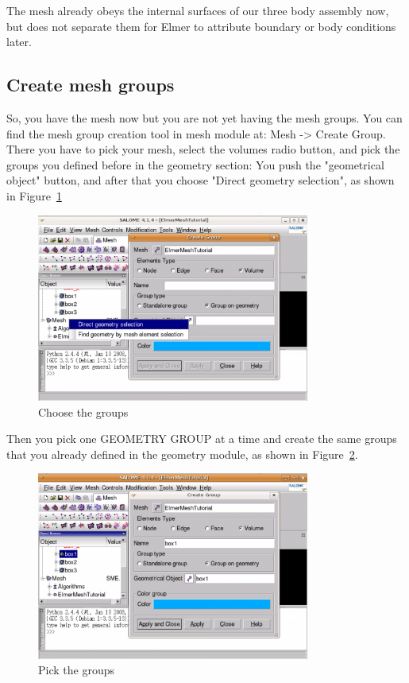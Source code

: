 The mesh already obeys the internal surfaces of our three body assembly now, but does not separate them for Elmer to attribute boundary or body conditions later.

\subsection{Create mesh groups}

So, you have the mesh now but you are not yet having the mesh groups. You can find the mesh group creation tool in mesh module at: Mesh -> Create Group. There you have to pick your mesh, select the volumes radio button, and pick the groups you defined before in the geometry section: You push the "geometrical object" button, and after that you choose "Direct geometry selection", as shown in Figure~\ref{fg:salome-7}

\begin{figure}[H]
\centering
\includegraphics[width=0.8\textwidth]{Salome-7-directgeometryselection}
\caption{Choose the groups}\label{fg:salome-7}
\end{figure}

Then you pick one GEOMETRY GROUP at a time and create the same groups that you already defined in the geometry module, as shown in Figure~\ref{fg:salome-8}.

\begin{figure}[H]
\centering
\includegraphics[width=0.8\textwidth]{Salome-8-pickgeometrygroups}
\caption{Pick the groups}\label{fg:salome-8}
\end{figure}

